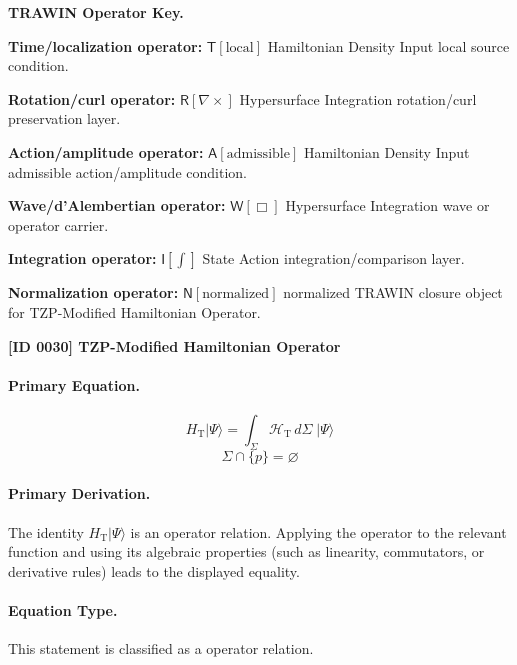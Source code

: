\par\vspace{0.45\baselineskip}
\noindent\begin{minipage}[t]{\linewidth}
\begingroup
\small
\raggedright
\textbf{TRAWIN Operator Key.}\par
\noindent\textbf{Time/localization operator:} $\mathsf{T}\!\left[\mathrm{local}\right]$ Hamiltonian Density Input local source condition.\par
\noindent\textbf{Rotation/curl operator:} $\mathsf{R}\!\left[\nabla\times\right]$ Hypersurface Integration rotation/curl preservation layer.\par
\noindent\textbf{Action/amplitude operator:} $\mathsf{A}\!\left[\mathrm{admissible}\right]$ Hamiltonian Density Input admissible action/amplitude condition.\par
\noindent\textbf{Wave/d'Alembertian operator:} $\mathsf{W}\!\left[\Box\right]$ Hypersurface Integration wave or operator carrier.\par
\noindent\textbf{Integration operator:} $\mathsf{I}\!\left[\int\right]$ State Action integration/comparison layer.\par
\noindent\textbf{Normalization operator:} $\mathsf{N}\!\left[\mathrm{normalized}\right]$ normalized TRAWIN closure object for TZP-Modified Hamiltonian Operator.\par
\endgroup
\end{minipage}

\clearpage
\noindent\textbf{[ID 0030] TZP-Modified Hamiltonian Operator}\par
\vspace{0.35em}
\paragraph{Primary Equation.}
\[
H_{\mathrm{T}}\lvert\Psi\rangle
=
\int_{\Sigma}\mathcal{H}_{\mathrm{T}}\,d\Sigma\;\lvert\Psi\rangle
\]
\[
\Sigma \cap \{p\} = \varnothing
\]

\paragraph{Primary Derivation.}
The identity \( H_{\mathrm{T}}\lvert\Psi\rangle \) is an operator relation. Applying the operator to the relevant function and using its algebraic properties (such as linearity, commutators, or derivative rules) leads to the displayed equality.
\paragraph{Equation Type.}
This statement is classified as a operator relation.

